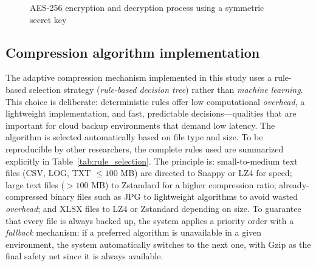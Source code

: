 \documentclass{iaesarticle}
\begin{document}
\begin{figure}[H]
\centering
{}
\vspace{.7em}
\caption{AES-256 encryption and decryption process using a symmetric secret key}
\label{fig:aes}
\end{figure}

\subsection{Compression algorithm implementation}
The adaptive compression mechanism implemented in this study uses a rule-based selection strategy (\textit{rule-based decision tree}) rather than \textit{machine learning}. This choice is deliberate: deterministic rules offer low computational \textit{overhead}, a lightweight implementation, and fast, predictable decisions---qualities that are important for cloud backup environments that demand low latency. The algorithm is selected automatically based on file type and size. To be reproducible by other researchers, the complete rules used are summarized explicitly in Table~\ref{tab:rule_selection}. The principle is: small-to-medium text files (CSV, LOG, TXT $\leq 100$ MB) are directed to Snappy or LZ4 for speed; large text files ($> 100$ MB) to Zstandard for a higher compression ratio; already-compressed binary files such as JPG to lightweight algorithms to avoid wasted \textit{overhead}; and XLSX files to LZ4 or Zstandard depending on size. To guarantee that every file is always backed up, the system applies a priority order with a \textit{fallback} mechanism: if a preferred algorithm is unavailable in a given environment, the system automatically switches to the next one, with Gzip as the final safety net since it is always available.
\end{document}
